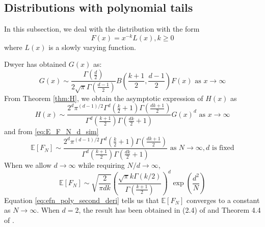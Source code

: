 \documentclass{aptpub}
\def\E{\mathbb{E}}
\begin{document}
\subsection{Distributions with polynomial tails}
In this subsection, we deal with the distribution with the form
\begin{equation}\label{eq:F_poly_tail}
     F(x) = x^{-k} L(x), k\geq 0
\end{equation}
where $L(x)$ is a slowly varying function.

Dwyer\cite{dwyer1991convex} has obtained $G(x)$ as:
\begin{equation}
     G(x) \sim \frac{\Gamma(\frac{d}{2})}{2\sqrt{\pi} \Gamma(\frac{d-1}{2})}
     B\left(\frac{k+1}{2}, \frac{d-1}{2}\right) F(x)  \textrm{ as } x\to \infty
\end{equation}
From Theorem \ref{thm:H}, we obtain the asymptotic
expression of $H(x)$ as
\begin{equation}
     H(x) \sim \frac{2^d \pi^{(d-1)/2}\Gamma^d(\frac{k}{2}+1)
     \Gamma(\frac{dk+1}{2})}{
         \Gamma^d(\frac{k+1}{2}) \Gamma(\frac{dk}{2}+1)} G(x)^d 
         \textrm{ as } x\to \infty
\end{equation}
and from \eqref{eq:E_F_N_d_sim}
\begin{equation}\label{eq:efn_poly_second_deri}
    \E[F_N] \sim \frac{2^d \pi^{(d-1)/2}\Gamma^d(\frac{k}{2}+1)
    \Gamma(\frac{dk+1}{2})}{
        \Gamma^d(\frac{k+1}{2}) \Gamma(\frac{dk}{2}+1)}
        \textrm{ as } N \to \infty, d \textrm { is fixed}
\end{equation}
When we allow $d\to \infty$ while requiring $N/d \to \infty$,
\begin{equation}\label{eq:poly_E_F_N_d_infty}
\E[F_N] \sim \sqrt{\frac{2}{\pi dk}}\left(
     \frac{\sqrt{\pi}k \Gamma(k/2)}
     {\Gamma(\frac{k+1}{2})}
 \right)^d
    \exp
      \left(\frac{d^2}{N} \right)  
\end{equation}
Equation \eqref{eq:efn_poly_second_deri} tells
us that $\E[F_N]$ converges to a constant as $N \to \infty$.
When $d=2$, the result has been obtained in (2.4) of \cite{carnal1970konvexe}
and Theorem 4.4 of \cite{davis1987convex}.
\end{document}
